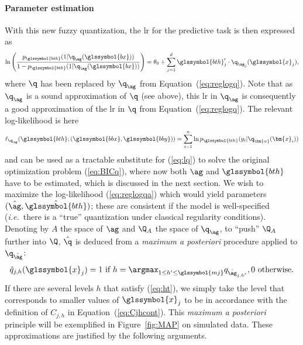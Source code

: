 \paragraph{Parameter estimation}

With this new fuzzy quantization, the \gls{lr} for the predictive task is then expressed as
\begin{equation}
    \label{eq:reglogqa}
    \ln \left( \dfrac{p_{\glssymbol{bth}}(1|\q_{\ag} (\glssymbol{bx}))}{1 - p_{\glssymbol{bth}}(1|\q_{\ag} (\glssymbol{bx}))} \right) = \theta_0 + \sum_{j=1}^d {\glssymbol{bth}_j' \cdot \q_{\ag_{j}}(\glssymbol{x}_j)},
\end{equation}
where $\q$ has been replaced by $\q_{\ag}$ from Equation~(\ref{eq:reglogq}).
Note that as $\q_{\ag}$ is a sound approximation of $\q$ (see above), this \gls{lr} in $\q_{\ag}$ is consequently a good approximation of the \gls{lr} in $\q$ from Equation~(\ref{eq:reglogq}). The relevant log-likelihood is here 
\begin{equation}
    \label{eq:lqa}
    \ell_{\q_{\ag}}(\glssymbol{bth} ; (\glssymbol{bbx},\glssymbol{bby}))=\sum_{i=1}^n \ln p_{\glssymbol{bth}}(y_i|\q_{\bm{\alpha}}(\bm{x}_i))
\end{equation}
and can be used as a tractable substitute for (\ref{eq:lq}) to solve the original optimization problem (\ref{eq:BICq}), where now both $\ag$ and $\glssymbol{bth}$ have to be estimated, which is discussed in the next section. We wish to maximize the log-likelihood (\ref{eq:reglogqa}) which would yield parameters $(\hat{\ag},\hat{\glssymbol{bth}})$; these are consistent if the model is well-specified (\textit{i.e.}\ there is a ``true'' quantization under classical regularity conditions). Denoting by $A$ the space of $\ag$ and $\Q_A$ the space of $\q_{\ag}$, to ``push'' $\Q_A$ further into $\Q$, $\hat{\q}$ is deduced from a \textit{maximum a posteriori} procedure applied to $\q_{\hat{\ag}}$:
\begin{equation}
    \label{eq:ht}
    \hat{q}_{j,h}(\glssymbol{x}_j) = 1 \text{ if } h = \argmax_{1 \leq h' \leq \glssymbol{mj}} q_{\hat{\ag}_{j,h'}}, 0 \text{ otherwise.}
\end{equation}
If there are several levels $h$ that satisfy (\ref{eq:ht}), we simply take the level that corresponds to smaller values of $\glssymbol{x}_j$ to be in accordance with the definition of $C_{j,h}$ in Equation~(\ref{eq:Cjhcont}). This {\it maximum a posteriori} principle will be exemplified in Figure~\ref{fig:MAP} on simulated data. These approximations are justified by the following arguments. 

